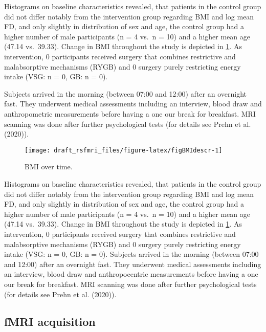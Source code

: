 \documentclass[
]{article}
\begin{document}
Histograms on baseline characteristics revealed, that patients in the control group did not differ notably from the intervention group regarding BMI and log mean FD, and only slightly in distribution of sex and age, the control group had a higher number of male participants (n = 4 vs.~n = 10) and a higher mean age (47.14 vs.~39.33). Change in BMI throughout the study is depicted in \ref{fig:figBMIdescr}.
As intervention, \(0\) participants received surgery that combines restrictive and malabsorptive mechanisms (RYGB) and \(0\) surgery purely restricting energy intake (VSG: n = \(0\), GB: n = \(0\)).

Subjects arrived in the morning (between 07:00 and 12:00) after an overnight fast. They underwent medical assessments including an interview, blood draw and anthropometric measurements before having a one our break for breakfast. MRI scanning was done after further psychological tests (for details see Prehn et al. (2020)).

\begin{figure}

{\centering \texttt{[image: draft\_rsfmri\_files/figure-latex/figBMIdescr-1]} 

}

\caption{BMI over time.}\label{fig:figBMIdescr}
\end{figure}

Histograms on baseline characteristics revealed, that patients in the control group did not differ notably from the intervention group regarding BMI and log mean FD, and only slightly in distribution of sex and age, the control group had a higher number of male participants (n = 4 vs.~n = 10) and a higher mean age (47.14 vs.~39.33). Change in BMI throughout the study is depicted in \ref{fig:figBMIdescr}.
As intervention, \(0\) participants received surgery that combines restrictive and malabsorptive mechanisms (RYGB) and \(0\) surgery purely restricting energy intake (VSG: n = \(0\), GB: n = \(0\)).
Subjects arrived in the morning (between 07:00 and 12:00) after an overnight fast. They underwent medical assessments including an interview, blood draw and anthropocentric measurements before having a one our break for breakfast. MRI scanning was done after further psychological tests (for details see Prehn et al. (2020)).

\hypertarget{fmri-acquisition}{%
\subsection{fMRI acquisition}\label{fmri-acquisition}}
\end{document}

